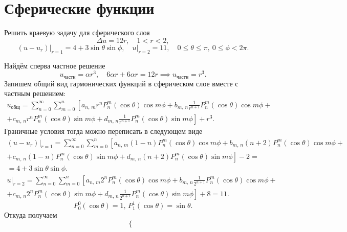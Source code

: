 \documentclass[a4paper]{article}
\begin{document}
\section{Сферические функции}
\begin{hiProb}[2015-2016 уч.г. №5]
Решить краевую задачу для сферического слоя
\[
	\Delta u=12 r, \quad 1<r<2
 ,\]
\[
	\left. (u-u_r) \right|_{r=1}=4+ 3 \sin \theta \sin \phi,
		\quad \left. u \right|_{r=2}=11,\quad
			0\le \theta\le \pi,\ 0\le \phi<2 \pi
.\] 
\end{hiProb}
\begin{sol}
Найдём сперва частное решение
\[
u_{\text{частн}}=\alpha r^3,\quad 6\alpha r+6 \alpha r=12 r\implies u_\text{частн}=r^3
.\] 
Запишем общий вид гармонических функций в сферическом слое вместе
с частным решением:
\begin{multline*}
u_\text{общ}=\sum_{n=0}^{\infty} \sum_{m=0}^{n} \left[ 
	a_{n,\,m}r^n P^m_n (\cos \theta)\cos m \phi+b_{m,\,n}
\frac{1}{r^{n+1}}P_n^m (\cos\theta) \cos m \phi 
\right.+\\+ \left.c_{m,\,n}r^n P^m_n (\cos\theta) \sin m\phi +
d_{m,\,n} \frac{1}{r^{n+1}} P^m_n (\cos \theta) \sin m \phi\right] 
+r^3
		.\end{multline*} 
Граничные условия тогда можно переписать в следующем виде
\begin{multline*}
	(u-u_r)|_{r=1}=\sum_{n=0}^{\infty} \sum_{m=0}^{n} \left[ 
		a_{n,\,m}(1-n) P^m_n (\cos \theta)\cos m \phi+b_{m,\,n}
		(n+2)P_n^m (\cos\theta) \cos m \phi 
		\right.+\\+ \left.c_{m,\,n}(1-n) P^m_n (\cos\theta) \sin m\phi +
	d_{m,\,n} (n+2) P^m_n (\cos \theta) \sin m \phi\right]
	-2=\\=4+3 \sin\theta \sin\phi
.\end{multline*} 
\begin{multline*}
u|_{r=2}=\sum_{n=0}^{\infty} \sum_{m=0}^{n} \left[ 
	a_{n,\,m}2^n P^m_n (\cos \theta)\cos m \phi+b_{m,\,n}
\frac{1}{2^{n+1}}P_n^m (\cos\theta) \cos m \phi 
\right.+\\+ \left.c_{m,\,n}2^n P^m_n (\cos\theta) \sin m\phi +
d_{m,\,n} \frac{1}{2^{n+1}} P^m_n (\cos \theta) \sin m \phi\right] 
+8=11
.\end{multline*} 
\[
	P_0^0(\cos \theta)=1,\,P_1^1(\cos \theta)=\sin\theta
.\] 
Откуда получаем
\[
\left\{
\begin{aligned}

\end{aligned}\]
\end{sol}
\end{document}
